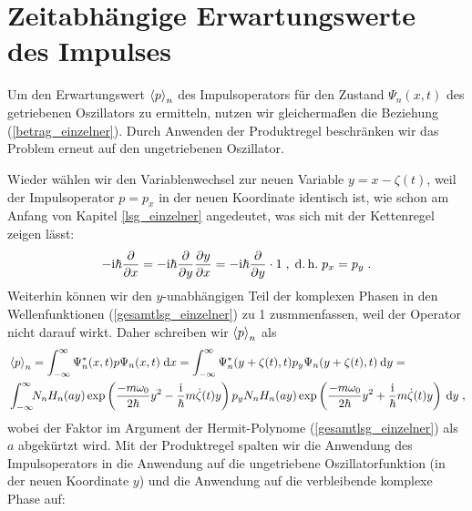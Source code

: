 




  \section{Zeitabhängige Erwartungswerte des Impulses}
    Um den Erwartungswert $\braket{p}_n$ des Impulsoperators für den Zustand $\Psi_n(x,t)$ des getriebenen Oszillators zu ermitteln, nutzen wir gleichermaßen die Beziehung (\ref{betrag_einzelner}).
    Durch Anwenden der Produktregel beschränken wir das Problem erneut auf den ungetriebenen Oszillator.

    Wieder wählen wir den Variablenwechsel zur neuen Variable $y=x-\zeta(t)$, weil der Impulsoperator $p=p_x$ in der neuen Koordinate identisch ist, wie schon am Anfang von Kapitel \ref{lsg_einzelner} angedeutet, was sich mit der Kettenregel zeigen lässt:
    \begin{equation}
      -\text i\hbar \frac{\partial}{\partial x} = -\text i\hbar \frac{\partial}{\partial y}\frac{\partial y}{\partial x} = -\text i\hbar \frac{\partial}{\partial y} \cdot 1 \; , \; \text{d.\,h.} \; p_x = p_y \; .
    \end{equation}
    Weiterhin können wir den $y$-unabhängigen Teil der komplexen Phasen in den Wellenfunktionen (\ref{gesamtlsg_einzelner}) zu 1 zusmmenfassen, weil der Operator nicht darauf wirkt.
    Daher schreiben wir $\braket{p}_n$ als
    \begin{align}
      &\braket{p}_n = \int_{-\infty}^{\infty} \Psi^*_n(x,t) p \Psi_n(x,t) \; \text dx
      = \int_{-\infty}^{\infty} \Psi^*_n(y+\zeta(t),t) p_y \Psi_n(y+\zeta(t),t) \: \text dy= \notag\\
      &\int_{-\infty}^{\infty} \!\! N_nH_n(ay)\exp\left(\frac{-m\omega_0}{2\hbar}y^2-\frac{\text i}{\hbar}m\dot{\zeta}(t)y\right) p_y N_nH_n(ay)\exp\left(\frac{-m\omega_0}{2\hbar}y^2+\frac{\text i}{\hbar}m\dot{\zeta}(t)y\right) \: \text dy \; ,
      \label{spaste}
    \end{align}
    wobei der Faktor im Argument der Hermit-Polynome (\ref{gesamtlsg_einzelner}) als $a$ abgekürtzt wird.
    Mit der Produktregel spalten wir die Anwendung des Impulsoperators in die Anwendung auf die ungetriebene Oszillatorfunktion (in der neuen Koordinate $y$) und die Anwendung auf die verbleibende komplexe Phase auf:
